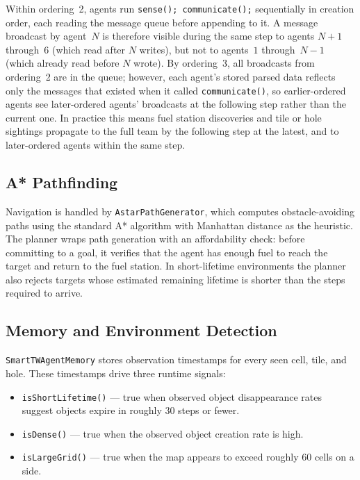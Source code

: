 \documentclass[letterpaper]{article}
\begin{document}
Within ordering~2, agents run \texttt{sense(); communicate();} sequentially in
creation order, each reading the message queue before appending to it. A message
broadcast by agent~$N$ is therefore visible during the same step to agents
$N{+}1$ through~6 (which read after $N$ writes), but not to agents~$1$
through~$N{-}1$ (which already read before $N$ wrote). By ordering~3, all
broadcasts from ordering~2 are in the queue; however, each agent's stored
parsed data reflects only the messages that existed when it called
\texttt{communicate()}, so earlier-ordered agents see later-ordered agents'
broadcasts at the following step rather than the current one. In practice this means fuel station discoveries
and tile or hole sightings propagate to the full team by the following step at
the latest, and to later-ordered agents within the same step.

\subsection{A* Pathfinding}

Navigation is handled by \texttt{AstarPathGenerator}, which computes
obstacle-avoiding paths using the standard A* algorithm with Manhattan distance
as the heuristic. The planner wraps path generation with an affordability check:
before committing to a goal, it verifies that the agent has enough fuel to reach
the target and return to the fuel station. In short-lifetime environments the
planner also rejects targets whose estimated remaining lifetime is shorter than
the steps required to arrive.

\subsection{Memory and Environment Detection}

\texttt{SmartTWAgentMemory} stores observation timestamps for every seen cell,
tile, and hole. These timestamps drive three runtime signals:

\begin{itemize}
\item \texttt{isShortLifetime()} --- true when observed object disappearance
rates suggest objects expire in roughly 30 steps or fewer.
\item \texttt{isDense()} --- true when the observed object creation rate is high.
\item \texttt{isLargeGrid()} --- true when the map appears to exceed roughly
60 cells on a side.
\end{itemize}
\end{document}

